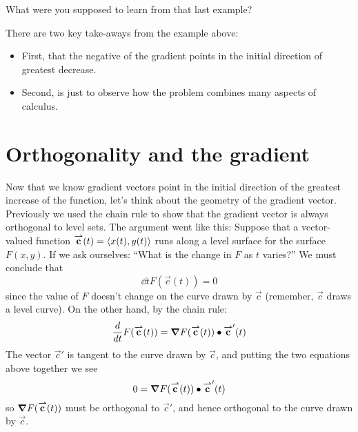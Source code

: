 \documentclass{ximera}
\begin{document}
\begin{question}
  What were you supposed to learn from that last example?
  \begin{prompt}
  \begin{multipleChoice}
  \end{multipleChoice}
  \begin{feedback}[correct]
  There are two key take-aways from the example above:
  \begin{itemize}
    \item First, that the negative of the gradient points in the
      initial direction of greatest decrease.
    \item Second, is just to observe how the problem combines
      many aspects of calculus.
  \end{itemize}
  \end{feedback}
  \end{prompt}
\end{question}







\section{Orthogonality and the gradient}


Now that we know gradient vectors point in the initial direction of
the greatest increase of the function, let's think about the geometry
of the gradient vector. Previously we used the chain rule to show that
the gradient vector is always orthogonal to level sets. The argument
went like this: Suppose that a vector-valued function
${\overset{\boldsymbol{\rightharpoonup}}{\mathbf{c}}}(t)=\left\langle x(t),y(t)\right\rangle$ runs along a level surface for the
surface $F(x,y)$.  If we ask ourselves: ``What is the change in $F$ as
$t$ varies?'' We must conclude that 
\[
\dd{t} F(\vec{c}(t)) = 0 
\]
since the value of $F$ doesn't change on the curve drawn by $\vec{c}$ (remember, $\vec{c}$ draws a level curve).
On the other hand, by the chain rule:
\[
\frac{\mathop{}\!d }{\mathop{}\!d t} F({\overset{\boldsymbol{\rightharpoonup}}{\mathbf{c}}}(t)) = \boldsymbol\nabla F({\overset{\boldsymbol{\rightharpoonup}}{\mathbf{c}}}(t)) \bullet {\overset{\boldsymbol{\rightharpoonup}}{\mathbf{c}}}'(t)
\]
The vector $\vec{c}'$ is tangent to the curve drawn by $\vec{c}$, and
putting the two equations above together we see
\[
0 = \boldsymbol\nabla F({\overset{\boldsymbol{\rightharpoonup}}{\mathbf{c}}}(t)) \bullet {\overset{\boldsymbol{\rightharpoonup}}{\mathbf{c}}}'(t)
\]
so $\boldsymbol\nabla F({\overset{\boldsymbol{\rightharpoonup}}{\mathbf{c}}}(t))$ must be orthogonal to $\vec{c}'$, and hence
orthogonal to the curve drawn by $\vec{c}$.
\end{document}
